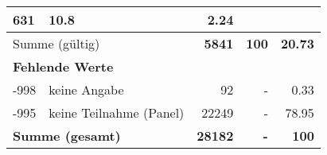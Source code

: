 \begin{longtable}{lXrrr}
       \num{631} &
       \num[round-mode=places,round-precision=2]{10.8} &
         \num[round-mode=places,round-precision=2]{2.24} \\
     \midrule
     \multicolumn{2}{l}{Summe (gültig)} &
       \textbf{\num{5841}} &
     \textbf{100} &
       \textbf{\num[round-mode=places,round-precision=2]{20.73}} \\
     \multicolumn{5}{l}{\textbf{Fehlende Werte}}\\
       -998 &
       keine Angabe &
         \num{92} &
        - &
         \num[round-mode=places,round-precision=2]{0.33} \\
       -995 &
       keine Teilnahme (Panel) &
         \num{22249} &
        - &
         \num[round-mode=places,round-precision=2]{78.95} \\
     \midrule
     \multicolumn{2}{l}{\textbf{Summe (gesamt)}} &
          \textbf{\num{28182}} &
        \textbf{-} &
        \textbf{100} \\
     \bottomrule
     \end{longtable}
     
